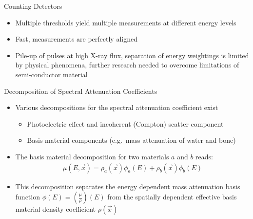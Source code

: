 \begin{frame}[c]{Counting Detectors}
    \begin{itemize}
        \setlength\itemsep{0.4cm}
        \item Multiple thresholds yield multiple measurements at different energy levels
        \item {} Fast, measurements are perfectly aligned
        \item {} Pile-up of pulses at high X-ray flux, separation of energy weightings is limited by physical phenomena, further research needed to overcome limitations of semi-conductor material
    \end{itemize}
\end{frame}

\begin{frame}[c]{Decomposition of Spectral Attenuation Coefficients}
    \begin{itemize}
        \item Various decompositions for the spectral attenuation coefficient exist
              \begin{itemize}
                  \item Photoelectric effect and incoherent (Compton) scatter component
                  \item Basis material components (e.g.\ mass attenuation of water and bone)
              \end{itemize}
        \item The basis material decomposition for two materials $a$ and $b$ reads:
              \begin{eqnarray*}
                  \mu(E, \vec x) = \rho_a(\vec x)\phi_a (E) + \rho_b(\vec x)\phi_b (E)
              \end{eqnarray*}
        \item This decomposition separates the energy dependent mass attenuation basis function $\phi(E)=\left(\frac{\mu}{\rho}\right)(E)$ from the spatially dependent effective basis material density  coefficient $\rho(\vec x)$
    \end{itemize}
\end{frame}

